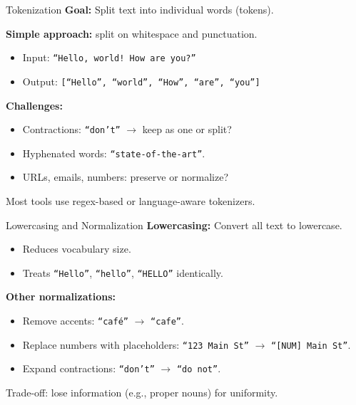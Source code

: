 \documentclass[10pt]{beamer}
\begin{document}
\begin{frame}{Tokenization}
    \textbf{Goal:} Split text into individual words (tokens).

    \vspace{0.2cm}
    \textbf{Simple approach:} split on whitespace and punctuation.
    \begin{itemize}
        \item Input: \texttt{``Hello, world! How are you?''}
        \item Output: \texttt{[``Hello'', ``world'', ``How'', ``are'', ``you'']}
    \end{itemize}

    \vspace{0.2cm}
    \textbf{Challenges:}
    \begin{itemize}
        \item Contractions: \texttt{``don't''} $\to$ keep as one or split?
        \item Hyphenated words: \texttt{``state-of-the-art''}.
        \item URLs, emails, numbers: preserve or normalize?
    \end{itemize}

    \vspace{0.2cm}
    Most tools use regex-based or language-aware tokenizers.
\end{frame}

\begin{frame}{Lowercasing and Normalization}
    \textbf{Lowercasing:} Convert all text to lowercase.
    \begin{itemize}
        \item Reduces vocabulary size.
        \item Treats \texttt{``Hello''}, \texttt{``hello''}, \texttt{``HELLO''} identically.
    \end{itemize}

    \vspace{0.2cm}
    \textbf{Other normalizations:}
    \begin{itemize}
        \item Remove accents: \texttt{``café''} $\to$ \texttt{``cafe''}.
        \item Replace numbers with placeholders: \texttt{``123 Main St''} $\to$ \texttt{``[NUM] Main St''}.
        \item Expand contractions: \texttt{``don't''} $\to$ \texttt{``do not''}.
    \end{itemize}

    \vspace{0.2cm}
    Trade-off: lose information (e.g., proper nouns) for uniformity.
\end{frame}
\end{document}
